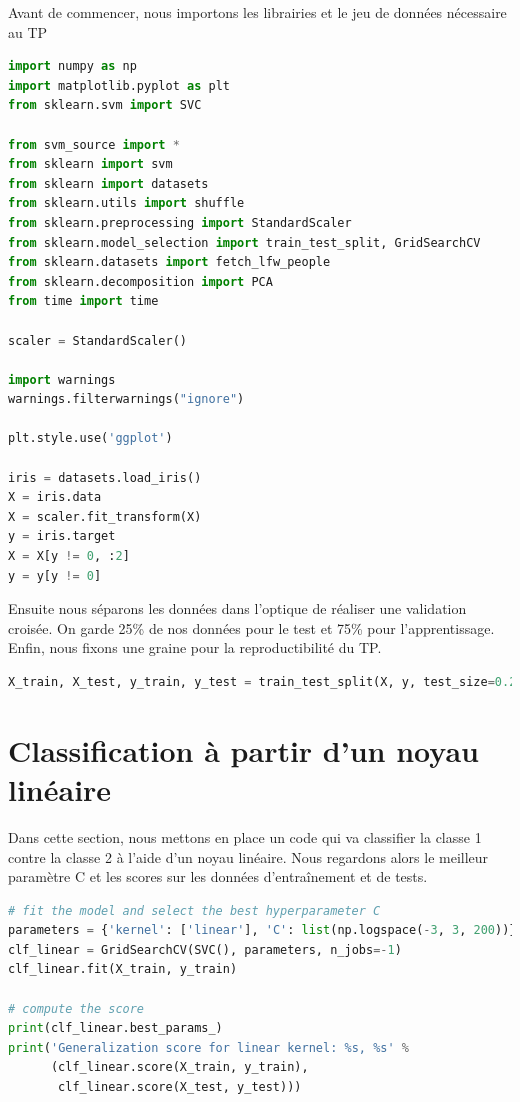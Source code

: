 \documentclass{book}
\begin{document}
Avant de commencer, nous importons les librairies et le jeu de données nécessaire au TP

\begin{lstlisting}[language=Python, caption=Préparation]
import numpy as np
import matplotlib.pyplot as plt
from sklearn.svm import SVC

from svm_source import *
from sklearn import svm
from sklearn import datasets
from sklearn.utils import shuffle
from sklearn.preprocessing import StandardScaler
from sklearn.model_selection import train_test_split, GridSearchCV
from sklearn.datasets import fetch_lfw_people
from sklearn.decomposition import PCA
from time import time

scaler = StandardScaler()

import warnings
warnings.filterwarnings("ignore")

plt.style.use('ggplot')

iris = datasets.load_iris()
X = iris.data
X = scaler.fit_transform(X)
y = iris.target
X = X[y != 0, :2]
y = y[y != 0]
\end{lstlisting}

Ensuite nous séparons les données dans l'optique de réaliser une validation croisée. On garde 25\% de nos données pour le test et 75\% pour l'apprentissage. Enfin, nous fixons une graine pour la reproductibilité du TP.

\begin{lstlisting}[language=Python, caption=Séparation pour validation croisée]
X_train, X_test, y_train, y_test = train_test_split(X, y, test_size=0.25, random_state=42, shuffle=True)
\end{lstlisting}

\section{Classification à partir d'un noyau linéaire}

Dans cette section, nous mettons en place un code qui va classifier la classe 1 contre la classe 2 à l'aide d'un noyau linéaire. Nous regardons alors le meilleur paramètre C et les scores sur les données d'entraînement et de tests.

\begin{lstlisting}[language=Python, caption=Classification des classes 1 contre 2 avec noyau linéaire]
# fit the model and select the best hyperparameter C
parameters = {'kernel': ['linear'], 'C': list(np.logspace(-3, 3, 200))}
clf_linear = GridSearchCV(SVC(), parameters, n_jobs=-1)
clf_linear.fit(X_train, y_train)

# compute the score
print(clf_linear.best_params_)
print('Generalization score for linear kernel: %s, %s' %
      (clf_linear.score(X_train, y_train),
       clf_linear.score(X_test, y_test)))
\end{lstlisting}
\end{document}
